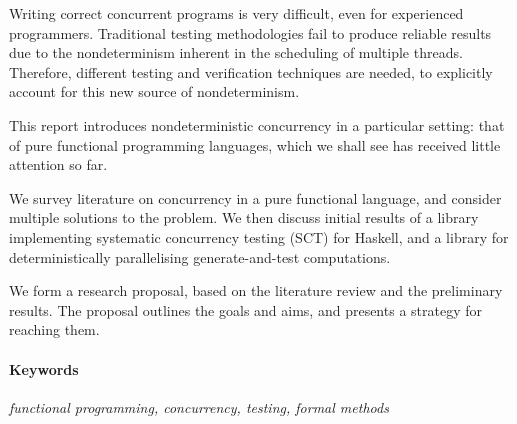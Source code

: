 Writing correct concurrent programs is very difficult, even for
experienced programmers. Traditional testing methodologies fail to
produce reliable results due to the nondeterminism inherent in the
scheduling of multiple threads. Therefore, different testing and
verification techniques are needed, to explicitly account for this new
source of nondeterminism.

This report introduces nondeterministic concurrency in a particular
setting: that of pure functional programming languages, which we shall
see has received little attention so far.

We survey literature on concurrency in a pure functional language, and
consider multiple solutions to the problem. We then discuss initial
results of a library implementing systematic concurrency testing (SCT)
for Haskell, and a library for deterministically parallelising
generate-and-test computations.

We form a research proposal, based on the literature review and the
preliminary results. The proposal outlines the goals and aims, and
presents a strategy for reaching them.

\vfill

\paragraph{Keywords}

\textit{functional programming, concurrency,
  testing, formal methods}